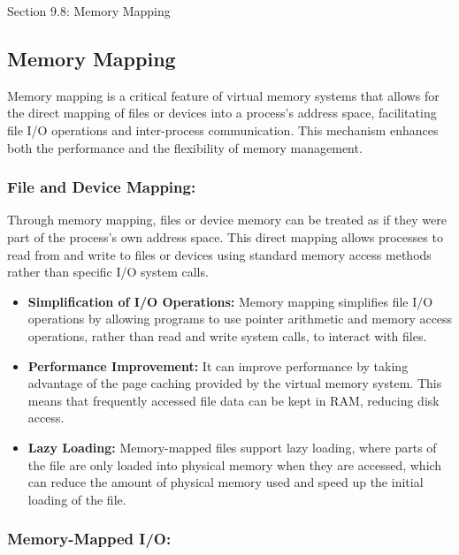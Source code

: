 \begin{notes}{Section 9.8: Memory Mapping}
    \subsection*{Memory Mapping}

    Memory mapping is a critical feature of virtual memory systems that allows for the direct mapping of files or devices into a process's address space, facilitating file I/O operations and inter-process 
    communication. This mechanism enhances both the performance and the flexibility of memory management. \vspace*{1em}
    
    \subsubsection*{File and Device Mapping:}
    
    Through memory mapping, files or device memory can be treated as if they were part of the process's own address space. This direct mapping allows processes to read from and write to files or devices 
    using standard memory access methods rather than specific I/O system calls.
    
    \begin{itemize}
        \item \textbf{Simplification of I/O Operations:} Memory mapping simplifies file I/O operations by allowing programs to use pointer arithmetic and memory access operations, rather than read and 
        write system calls, to interact with files.
        \item \textbf{Performance Improvement:} It can improve performance by taking advantage of the page caching provided by the virtual memory system. This means that frequently accessed file data 
        can be kept in RAM, reducing disk access.
        \item \textbf{Lazy Loading:} Memory-mapped files support lazy loading, where parts of the file are only loaded into physical memory when they are accessed, which can reduce the amount of physical 
        memory used and speed up the initial loading of the file.
    \end{itemize}
    
    \subsubsection*{Memory-Mapped I/O:}
    

\end{notes}
